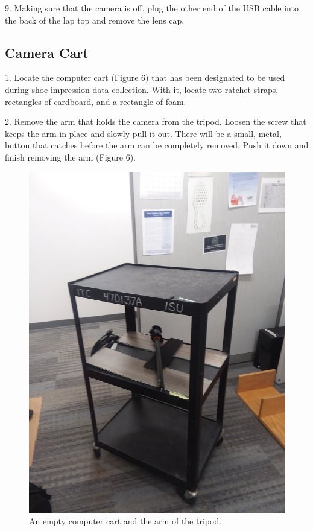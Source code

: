 9. Making sure that the camera is off, plug the other end of the USB cable into the back of the lap top and remove the lens cap.



\subsection{Camera Cart}

1. Locate the computer cart (Figure 6) that has been designated to be used during shoe impression data collection. With it, locate two ratchet straps, rectangles of cardboard, and a rectangle of foam. 

2. Remove the arm that holds the camera from the tripod. Loosen the screw that keeps the arm in place and slowly pull it out. There will be a small, metal, button that catches before the arm can be completely removed. Push it down and finish removing the arm (Figure 6). 

\begin{figure}[!htp]
\centering
\includegraphics[scale=.2]{CartNew.png}
\caption{An empty computer cart and the arm of the tripod.}
\label{Image 6}
\end{figure}

